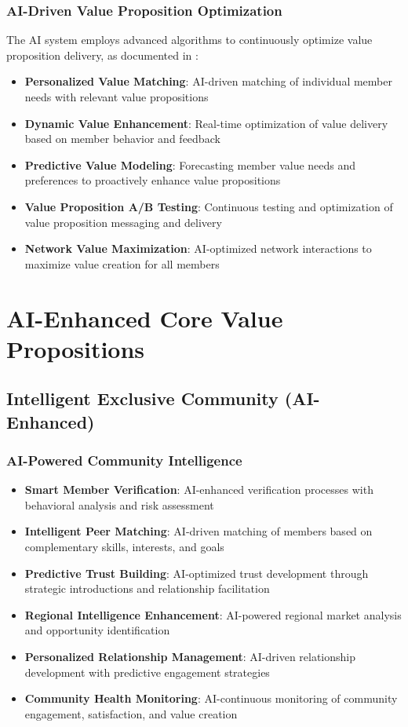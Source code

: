 \subsubsection{AI-Driven Value Proposition Optimization}

The AI system employs advanced algorithms to continuously optimize value proposition delivery, as documented in \citep{ferede_artificial_intelligence_ai}:

\begin{itemize}
    \item \textbf{Personalized Value Matching}: AI-driven matching of individual member needs with relevant value propositions
    \item \textbf{Dynamic Value Enhancement}: Real-time optimization of value delivery based on member behavior and feedback
    \item \textbf{Predictive Value Modeling}: Forecasting member value needs and preferences to proactively enhance value propositions
    \item \textbf{Value Proposition A/B Testing}: Continuous testing and optimization of value proposition messaging and delivery
    \item \textbf{Network Value Maximization}: AI-optimized network interactions to maximize value creation for all members
\end{itemize}

\section{AI-Enhanced Core Value Propositions}

\subsection{Intelligent Exclusive Community (AI-Enhanced)}

\subsubsection{AI-Powered Community Intelligence}

\begin{itemize}
    \item \textbf{Smart Member Verification}: AI-enhanced verification processes with behavioral analysis and risk assessment
    \item \textbf{Intelligent Peer Matching}: AI-driven matching of members based on complementary skills, interests, and goals
    \item \textbf{Predictive Trust Building}: AI-optimized trust development through strategic introductions and relationship facilitation
    \item \textbf{Regional Intelligence Enhancement}: AI-powered regional market analysis and opportunity identification
    \item \textbf{Personalized Relationship Management}: AI-driven relationship development with predictive engagement strategies
    \item \textbf{Community Health Monitoring}: AI-continuous monitoring of community engagement, satisfaction, and value creation
\end{itemize}

